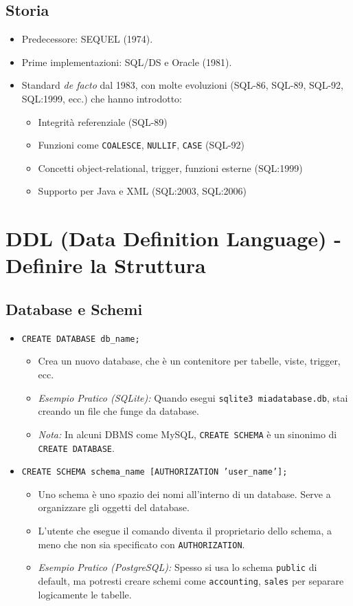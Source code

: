 \documentclass{article}
\begin{document}
	\subsection{Storia}
	\begin{itemize}
		\item Predecessore: SEQUEL (1974).
		\item Prime implementazioni: SQL/DS e Oracle (1981).
		\item Standard \textit{de facto} dal 1983, con molte evoluzioni (SQL-86, SQL-89, SQL-92, SQL:1999, ecc.) che hanno introdotto:
		\begin{itemize}
			\item Integrità referenziale (SQL-89)
			\item Funzioni come \texttt{COALESCE}, \texttt{NULLIF}, \texttt{CASE} (SQL-92)
			\item Concetti object-relational, trigger, funzioni esterne (SQL:1999)
			\item Supporto per Java e XML (SQL:2003, SQL:2006)
		\end{itemize}
	\end{itemize}
	
	\section{DDL (Data Definition Language) - Definire la Struttura}
	
	\subsection{Database e Schemi}
	\begin{itemize}
		\item \texttt{CREATE DATABASE db\_name;}
		\begin{itemize}
			\item Crea un nuovo database, che è un contenitore per tabelle, viste, trigger, ecc.
			\item \textit{Esempio Pratico (SQLite):} Quando esegui \texttt{sqlite3 miadatabase.db}, stai creando un file che funge da database.
			\item \textit{Nota:} In alcuni DBMS come MySQL, \texttt{CREATE SCHEMA} è un sinonimo di \texttt{CREATE DATABASE}.
		\end{itemize}
		\item \texttt{CREATE SCHEMA schema\_name [AUTHORIZATION 'user\_name'];}
		\begin{itemize}
			\item Uno schema è uno spazio dei nomi all'interno di un database. Serve a organizzare gli oggetti del database.
			\item L'utente che esegue il comando diventa il proprietario dello schema, a meno che non sia specificato con \texttt{AUTHORIZATION}.
			\item \textit{Esempio Pratico (PostgreSQL):} Spesso si usa lo schema \texttt{public} di default, ma potresti creare schemi come \texttt{accounting}, \texttt{sales} per separare logicamente le tabelle.
		\end{itemize}
	\end{itemize}
	
\end{document}
